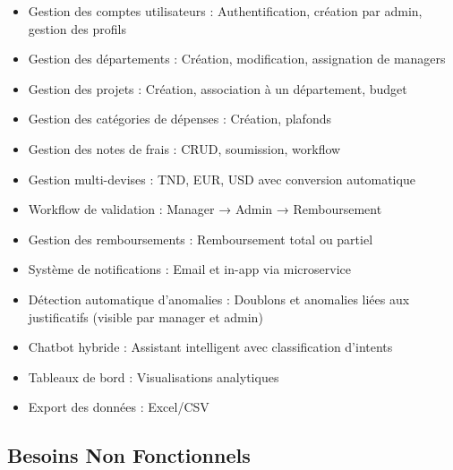 \documentclass[12pt,a4paper]{report}
\begin{document}
\begin{itemize}

 \item Gestion des comptes utilisateurs : Authentification, création par admin, gestion des profils

 \item Gestion des départements : Création, modification, assignation de managers

 \item Gestion des projets : Création, association à un département, budget

 \item Gestion des catégories de dépenses : Création, plafonds

 \item Gestion des notes de frais : CRUD, soumission, workflow

 \item Gestion multi-devises : TND, EUR, USD avec conversion automatique

 \item Workflow de validation : Manager → Admin → Remboursement

 \item Gestion des remboursements : Remboursement total ou partiel

 \item Système de notifications : Email et in-app via microservice

 

 \item Détection automatique d'anomalies : Doublons et anomalies liées aux justificatifs (visible par manager et admin)

 \item Chatbot hybride : Assistant intelligent avec classification d'intents

 \item Tableaux de bord : Visualisations analytiques

 \item Export des données : Excel/CSV

\end{itemize}



\subsection{Besoins Non Fonctionnels}
\end{document}

